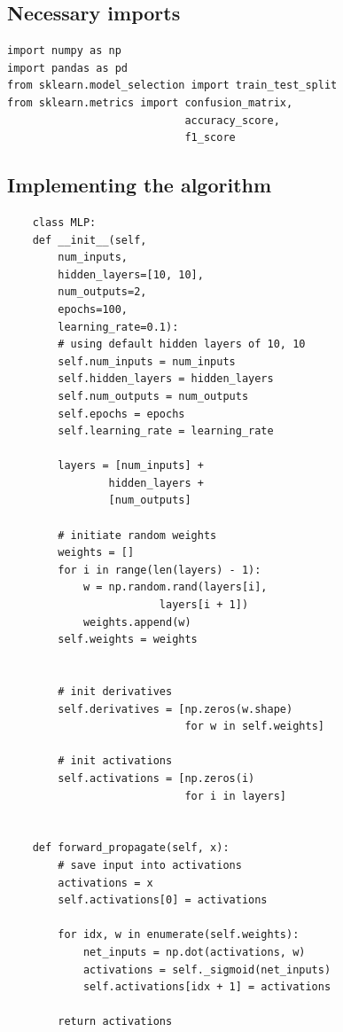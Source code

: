 \subsection{Necessary imports}
\begin{verbatim}
import numpy as np
import pandas as pd
from sklearn.model_selection import train_test_split
from sklearn.metrics import confusion_matrix, 
                            accuracy_score, 
                            f1_score
\end{verbatim}
\subsection{Implementing the algorithm}
\begin{verbatim}
    class MLP:
    def __init__(self, 
        num_inputs, 
        hidden_layers=[10, 10], 
        num_outputs=2, 
        epochs=100, 
        learning_rate=0.1):
        # using default hidden layers of 10, 10
        self.num_inputs = num_inputs
        self.hidden_layers = hidden_layers
        self.num_outputs = num_outputs
        self.epochs = epochs
        self.learning_rate = learning_rate

        layers = [num_inputs] + 
                hidden_layers + 
                [num_outputs]

        # initiate random weights 
        weights = []
        for i in range(len(layers) - 1):
            w = np.random.rand(layers[i], 
                        layers[i + 1])
            weights.append(w)
        self.weights = weights


        # init derivatives
        self.derivatives = [np.zeros(w.shape) 
                            for w in self.weights]

        # init activations  
        self.activations = [np.zeros(i) 
                            for i in layers]


    def forward_propagate(self, x):
        # save input into activations
        activations = x 
        self.activations[0] = activations

        for idx, w in enumerate(self.weights):
            net_inputs = np.dot(activations, w)
            activations = self._sigmoid(net_inputs)
            self.activations[idx + 1] = activations

        return activations



\end{verbatim}

